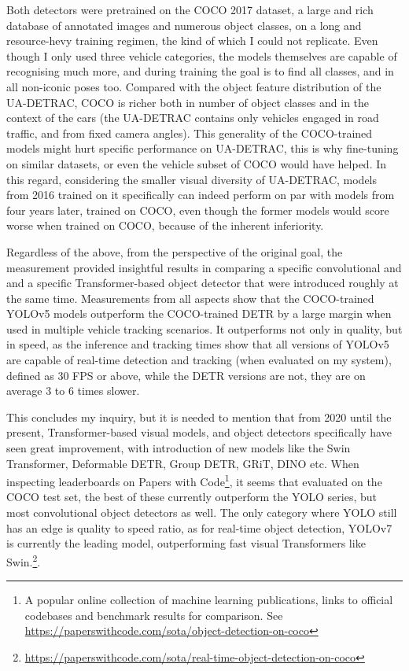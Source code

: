 Both detectors were pretrained on the COCO 2017 dataset, a large and rich database of annotated images and numerous object classes, on a long and resource-hevy training regimen, the kind of which I could not replicate. Even though I only used three vehicle categories, the models themselves are capable of recognising much more, and during training the goal is to find all classes, and in all non-iconic poses too. Compared with the object feature distribution of the UA-DETRAC, COCO is richer both in number of object classes and in the context of the cars (the UA-DETRAC contains only vehicles engaged in road traffic, and from fixed camera angles). This generality of the COCO-trained models might hurt specific performance on UA-DETRAC, this is why fine-tuning on similar datasets, or even the vehicle subset of COCO would have helped. In this regard, considering the smaller visual diversity of UA-DETRAC, models from 2016 trained on it specifically can indeed perform on par with models from four years later, trained on COCO, even though the former models would score worse when trained on COCO, because of the inherent inferiority.

Regardless of the above, from the perspective of the original goal, the measurement provided insightful results in comparing a specific convolutional and and a specific Transformer-based object detector that were introduced roughly at the same time. Measurements from all aspects show that the COCO-trained YOLOv5 models outperform the COCO-trained DETR by a large margin when used in multiple vehicle tracking scenarios. It outperforms not only in quality, but in speed, as the inference and tracking times show that all versions of YOLOv5 are capable of real-time detection and tracking (when evaluated on my system), defined as 30 FPS or above, while the DETR versions are not, they are on average 3 to 6 times slower.

This concludes my inquiry, but it is needed to mention that from 2020 until the present, Transformer-based visual models, and object detectors specifically have seen great improvement, with introduction of new models like the Swin Transformer, Deformable DETR, Group DETR, GRiT, DINO etc. When inspecting leaderboards on Papers with Code\footnote{A popular online collection of machine learning publications, links to official codebases and benchmark results for comparison. See \url{https://paperswithcode.com/sota/object-detection-on-coco}}, it seems that evaluated on the COCO test set, the best of these currently outperform the YOLO series, but most convolutional object detectors as well. The only category where YOLO still has an edge is quality to speed ratio, as for real-time object detection, YOLOv7 is currently the leading model, outperforming fast visual Transformers like Swin.\footnote{\url{https://paperswithcode.com/sota/real-time-object-detection-on-coco}}.
